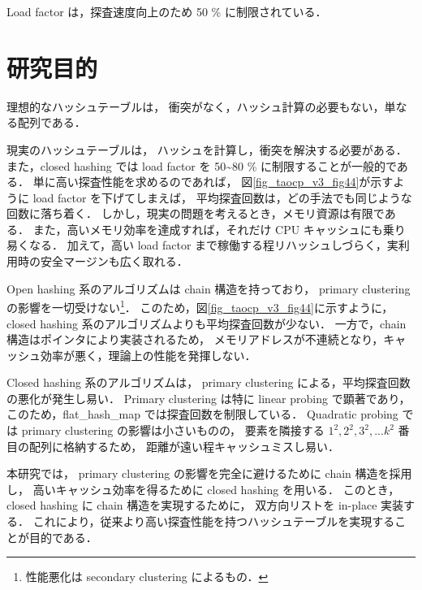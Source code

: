 Load factor は，探査速度向上のため 50 \% に制限されている．

\section{研究目的}
理想的なハッシュテーブルは，
衝突がなく，ハッシュ計算の必要もない，単なる配列である．

現実のハッシュテーブルは，
ハッシュを計算し，衝突を解決する必要がある．
また，closed hashing では load factor を 50\textasciitilde 80 \% に制限することが一般的である．
単に高い探査性能を求めるのであれば，
図\ref{fig_taocp_v3_fig44}が示すように load factor を下げてしまえば，
平均探査回数は，どの手法でも同じような回数に落ち着く．
しかし，現実の問題を考えるとき，メモリ資源は有限である．
また，高いメモリ効率を達成すれば，それだけ CPU キャッシュにも乗り易くなる．
加えて，高い load factor まで稼働する程リハッシュしづらく，実利用時の安全マージンも広く取れる．

Open hashing 系のアルゴリズムは chain 構造を持っており，
primary clustering の影響を一切受けない\footnote{性能悪化は secondary clustering によるもの．}．
このため，図\ref{fig_taocp_v3_fig44}に示すように，
closed hashing 系のアルゴリズムよりも平均探査回数が少ない．
一方で，chain 構造はポインタにより実装されるため，
メモリアドレスが不連続となり，キャッシュ効率が悪く，理論上の性能を発揮しない．

Closed hashing 系のアルゴリズムは，
primary clustering による，平均探査回数の悪化が発生し易い．
Primary clustering は特に linear probing で顕著であり，
このため，flat\_hash\_map では探査回数を制限している．
Quadratic probing では primary clustering の影響は小さいものの，
要素を隣接する $1^2, 2^2, 3^2, ... k^2$ 番目の配列に格納するため，
距離が遠い程キャッシュミスし易い．

本研究では，
primary clustering の影響を完全に避けるために chain 構造を採用し，
高いキャッシュ効率を得るために closed hashing を用いる．
このとき，closed hashing に chain 構造を実現するために，
双方向リストを in-place 実装する．
これにより，従来より高い探査性能を持つハッシュテーブルを実現することが目的である．



